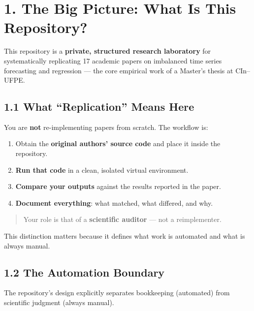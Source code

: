 \section{1. The Big Picture: What Is This
Repository?}\label{the-big-picture-what-is-this-repository}

This repository is a \textbf{private, structured research laboratory}
for systematically replicating 17 academic papers on imbalanced time
series forecasting and regression --- the core empirical work of a
Master's thesis at CIn--UFPE.

\subsection{1.1 What ``Replication'' Means
Here}\label{what-replication-means-here}

You are \textbf{not} re-implementing papers from scratch. The workflow
is:

\begin{enumerate}
\def\labelenumi{\arabic{enumi}.}
\tightlist
\item
  Obtain the \textbf{original authors' source code} and place it inside
  the repository.
\item
  \textbf{Run that code} in a clean, isolated virtual environment.
\item
  \textbf{Compare your outputs} against the results reported in the
  paper.
\item
  \textbf{Document everything}: what matched, what differed, and why.
\end{enumerate}

\begin{quote}
\small Your role is that of a \textbf{scientific auditor} --- not a
reimplementer.
\end{quote}

This distinction matters because it defines what work is automated and
what is always manual.

\subsection{1.2 The Automation Boundary}\label{the-automation-boundary}

The repository's design explicitly separates bookkeeping (automated)
from scientific judgment (always manual).

